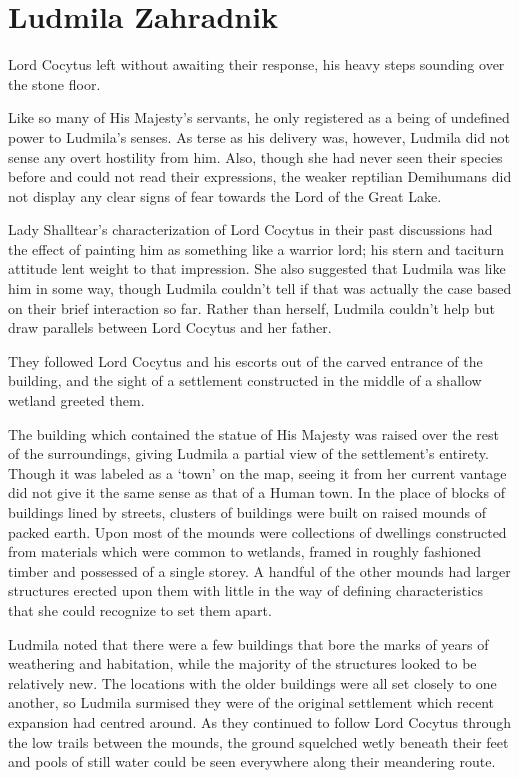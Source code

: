 \chapter{Ludmila Zahradnik}

Lord Cocytus left without awaiting their response, his heavy steps sounding over the stone floor.

 

Like so many of His Majesty’s servants, he only registered as a being of undefined power to Ludmila’s senses. As terse as his delivery was, however, Ludmila did not sense any overt hostility from him. Also, though she had never seen their species before and could not read their expressions, the weaker reptilian Demihumans did not display any clear signs of fear towards the Lord of the Great Lake.

 

Lady Shalltear’s characterization of Lord Cocytus in their past discussions had the effect of painting him as something like a warrior lord; his stern and taciturn attitude lent weight to that impression. She also suggested that Ludmila was like him in some way, though Ludmila couldn’t tell if that was actually the case based on their brief interaction so far. Rather than herself, Ludmila couldn’t help but draw parallels between Lord Cocytus and her father.

 

They followed Lord Cocytus and his escorts out of the carved entrance of the building, and the sight of a settlement constructed in the middle of a shallow wetland greeted them.

 

The building which contained the statue of His Majesty was raised over the rest of the surroundings, giving Ludmila a partial view of the settlement’s entirety. Though it was labeled as a ‘town’ on the map, seeing it from her current vantage did not give it the same sense as that of a Human town. In the place of blocks of buildings lined by streets, clusters of buildings were built on raised mounds of packed earth. Upon most of the mounds were collections of dwellings constructed from materials which were common to wetlands, framed in roughly fashioned timber and possessed of a single storey. A handful of the other mounds had larger structures erected upon them with little in the way of defining characteristics that she could recognize to set them apart.

 

Ludmila noted that there were a few buildings that bore the marks of years of weathering and habitation, while the majority of the structures looked to be relatively new. The locations with the older buildings were all set closely to one another, so Ludmila surmised they were of the original settlement which recent expansion had centred around. As they continued to follow Lord Cocytus through the low trails between the mounds, the ground squelched wetly beneath their feet and pools of still water could be seen everywhere along their meandering route.

